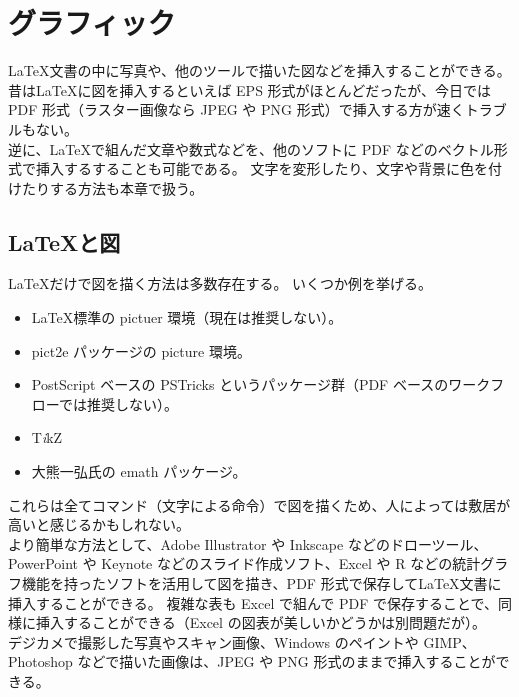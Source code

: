 \chapter{グラフィック}
\LaTeX{}文書の中に写真や、他のツールで描いた図などを挿入することができる。
昔は\LaTeX{}に図を挿入するといえば EPS 形式がほとんどだったが、今日では PDF 形式（ラスター画像なら JPEG や PNG 形式）で挿入する方が速くトラブルもない。\\

逆に、\LaTeX{}で組んだ文章や数式などを、他のソフトに PDF などのベクトル形式で挿入するすることも可能である。
文字を変形したり、文字や背景に色を付けたりする方法も本章で扱う。
\section{\LaTeX{}と図}
\LaTeX{}だけで図を描く方法は多数存在する。
いくつか例を挙げる。
\begin{itemize}\setlength{\leftskip}{-1.00zw}%
\item \LaTeX{}標準の pictuer 環境（現在は推奨しない）。
\item pict2e パッケージの picture 環境。
\item PostScript ベースの PSTricks というパッケージ群（PDF ベースのワークフローでは推奨しない）。
\item T\textit{i}kZ
\item 大熊一弘{\small 氏}の emath パッケージ。
\end{itemize}
これらは全てコマンド（文字による命令）で図を描くため、人によっては敷居が高いと感じるかもしれない。\\

より簡単な方法として、Adobe Illustrator や Inkscape などのドローツール、PowerPoint や Keynote などのスライド作成ソフト、Excel や R などの統計グラフ機能を持ったソフトを活用して図を描き、PDF 形式で保存して\LaTeX{}文書に挿入することができる。
複雑な表も Excel で組んで PDF で保存することで、同様に挿入することができる（Excel の図表が美しいかどうかは別問題だが）。\\

デジカメで撮影した写真やスキャン画像、Windows のペイントや GIMP、Photoshop などで描いた画像は、JPEG や PNG 形式のままで挿入することができる。

